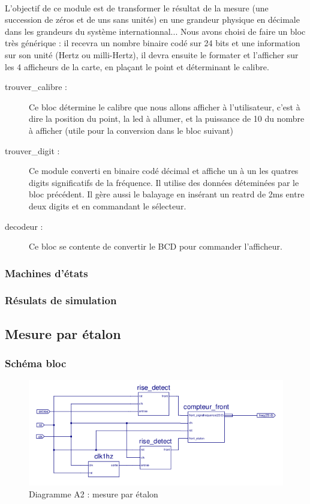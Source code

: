 \documentclass[a4paper,11pt]{article}
\begin{document}
\paragraph{} L'objectif de ce module est de transformer le résultat de la mesure (une succession de zéros et de uns sans unités) 
en une grandeur physique en décimale dans les grandeurs du système internationnal... Nous avons choisi de faire un bloc très générique : 
il recevra un nombre binaire codé sur 24 bits et une information sur son unité (Hertz ou milli-Hertz), il devra ensuite le formater 
et l'afficher sur les 4 afficheurs de la carte, en plaçant le point et déterminant le calibre.

\begin{description}
  \item[trouver\_calibre : ] Ce bloc détermine le calibre que nous allons afficher à l'utilisateur, c'est à dire la position du point, la
  led à allumer, et la puissance de 10 du nombre à afficher (utile pour la conversion dans le bloc suivant)
  \item[trouver\_digit : ] Ce module converti en binaire codé décimal et affiche un à un les quatres digits significatifs de la fréquence. 
  Il utilise des données déteminées par le bloc précédent. Il gère aussi le balayage en insérant un reatrd de 2ms entre deux digits et 
  en commandant le sélecteur.
  \item[decodeur : ] Ce bloc se contente de convertir le BCD pour commander l'afficheur.
\end{description}


  \subsubsection{Machines d'états}
  \subsubsection{Résulats de simulation}


\subsection{Mesure par étalon}
  \subsubsection{Schéma bloc}
  
  \begin{figure}[H]
\begin{center}
	\includegraphics[scale=1]{sch-etalon.png}
	\caption{Diagramme A2 : mesure par étalon}
\end{center}
\end{figure}
\end{document}
